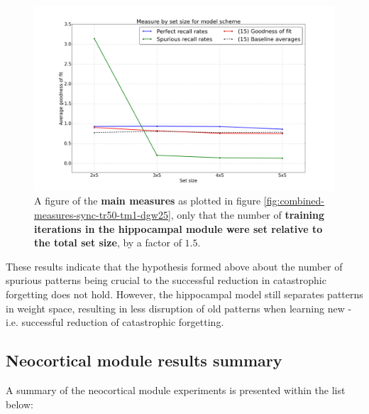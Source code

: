 \begin{figure}
    \centering
    \includegraphics[width=13cm]{fig/hypothesis-test-sync/combined-measures-sync-tm1-tr30-relative-iters}
    \caption{A figure of the \textbf{main measures} as plotted in figure \ref{fig:combined-measures-sync-tr50-tm1-dgw25}, only that the number of \textbf{training iterations in the hippocampal module were set relative to the total set size}, by a factor of $1.5$.}
    \label{fig:combined-measures-sync-tm1-tr30-relative-iters}
\end{figure}

These results indicate that the hypothesis formed above about the number of spurious patterns being crucial to the successful reduction in catastrophic forgetting does not hold. However, the hippocampal model still separates patterns in weight space, resulting in less disruption of old patterns when learning new - i.e. successful reduction of catastrophic forgetting.



\subsection{Neocortical module results summary}

A summary of the neocortical module experiments is presented within the list below:

